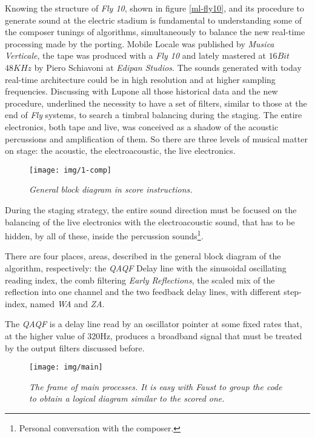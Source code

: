 \documentclass[twoside,a4paper]{article}
\begin{document}
Knowing the structure of \emph{Fly 10}, shown in figure \ref{ml-fly10}, and its
procedure to generate sound at the electric stadium is fundamental to understanding
some of the composer tunings of algorithms, simultaneously to balance the new
real-time processing made by the porting. Mobile Locale was published by \emph{Musica
Verticale}, the tape was produced with a \emph{Fly 10} and lately mastered at
$16Bit$ $48KHz$ by Piero Schiavoni at \emph{Edipan Studios}. %
The sounds generated with today real-time architecture could be in high resolution
and at higher sampling frequencies. Discussing with Lupone all those historical
data and the new procedure, underlined the necessity to have a set of filters,
similar to those at the end of \emph{Fly} systems, to search a timbral balancing
during the staging. The entire electronics, both tape and live, was conceived as a shadow of the
acoustic percussions and amplification of them. So there are three levels of
musical matter on stage: the acoustic, the electroacoustic, the live electronics.

\begin{figure}[ht]
\centerline{\texttt{[image: img/1-comp]}}
\caption{\label{ml-gen-dia}{\it General block diagram in score instructions.}}
\end{figure}

During the staging strategy, the entire sound direction must be focused on the
balancing of the live electronics with the electroacoustic sound, that has to be
hidden, by all of these, inside the percussion sounds\footnote{Personal
conversation with the composer.}.

There are four places, areas, described in the general block diagram of the
algorithm, respectively: the \emph{QAQF} Delay line with the sinusoidal oscillating
reading index, the comb filtering \emph{Early Reflections}, the scaled mix of
the reflection into one channel and the two feedback delay lines, with different
step-index, named \emph{WA} and \emph{ZA}.

The \emph{QAQF} is a delay line read by an oscillator pointer at some fixed rates
that, at the higher value of 320Hz, produces a broadband signal that must be
treated by the output filters discussed before.

\begin{figure}[hb]
\centerline{\texttt{[image: img/main]}}
\caption{\label{ml-main}{\it The frame of main processes. It is easy with Faust
to group the code to obtain a logical diagram similar to the scored one. }}
\end{figure}
\end{document}
